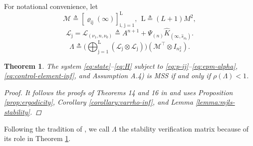\documentclass[journal,twoside,web]{ieeecolor}
\newtheorem{theorem}{Theorem}
\begin{document}
For notational convenience, let 
\begin{equation}\label{eq:mathcalM}
    \mathcal{M} \triangleq \left[ \varrho_{{\mathrm{i}\mathrm{j}}}(\infty)\right]_{\mathrm{i},\,\mathrm{j}=1}^{\mathrm{L}},~~
    \mathrm{L}\triangleq (L+1)M^2,
\end{equation}
\begin{equation}\label{eq:mathcalL}
    \mathcal{L}_{\mathrm{j}} = \mathcal{L}_{({\nu_1},n,{\nu_0})} \triangleq A^{n+1} + \mathit{\Psi}_{(n)} \hat{K}_{(\infty,\hat{s}_{\nu_0})}.
\end{equation}
\begin{equation}\label{eq:Lambda}
\mathit{\Lambda} \triangleq \bigg( \bigoplus_{\mathrm{j}=1}^{\mathrm{L}} 
    \left( \mathcal{L}_{\mathrm{j}} \otimes \mathcal{L}_{\mathrm{j}} \right)\bigg)
    \left( \mathcal{M}^{\top} \otimes I_{n_x^2} \right). %
\end{equation}
\begin{theorem}\label{theorem:stability}
    The system \eqref{eq:state}–\eqref{eq:H} subject to \eqref{eq:p-ij}–\eqref{eq:epm-alpha}, \eqref{eq:control-element-inf}, and Assumption A.4) is MSS if and only if $\rho\left(\mathit{\Lambda}\right)<1$.

    \begin{proof}
        It follows the proofs of Theorems 14 and 16 in \cite{yZL-2025-automatica} and uses Proposition \ref{prop:ergodicity}, Corollary \ref{corollary:varrho-inf}, and Lemma \ref{lemma:mjls-stability}.
    \end{proof}
\end{theorem}
Following the tradition of \cite{yZL-2025-automatica}, we call $\mathit{\Lambda}$ the stability verification matrix because of its role in Theorem \ref{theorem:stability}.
\end{document}

